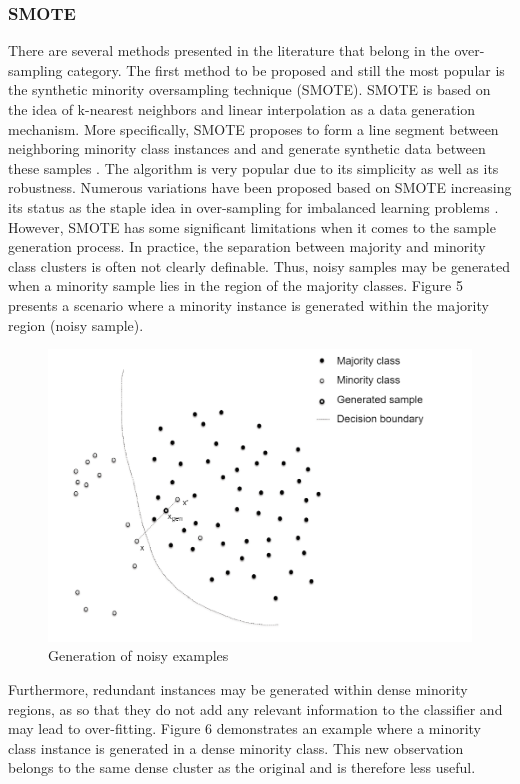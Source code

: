 \documentclass[parskip=full]{scrartcl}
\begin{document}
\subsubsection{SMOTE}

There are several methods presented in the literature that belong in the over-sampling category. The 
first method to be  proposed and still the most popular is the synthetic minority oversampling technique 
(SMOTE). SMOTE is based on the idea of k-nearest neighbors and linear interpolation as a data 
generation mechanism. More specifically, SMOTE proposes to form a line segment between neighboring 
minority class instances and and generate synthetic data between these samples \cite{Chawla.2002}. 
The algorithm is very popular due to its simplicity as well as its robustness. Numerous variations have 
been proposed based on SMOTE increasing its status as the staple idea in over-sampling for 
imbalanced learning problems \cite{Fernandez.2018}. However, SMOTE has some significant limitations 
when it comes to the sample generation process. In practice, the separation between majority and 
minority class clusters is often not clearly definable. Thus, noisy samples may be generated when a 
minority sample lies in the region of the majority classes. Figure 5 presents a scenario where a
minority instance is generated within the majority region (noisy sample).

\begin{figure}[H]
	\centering
	\includegraphics[width=0.6\linewidth]{./resources/noisy_examples}
	\caption{Generation of noisy examples \cite{Douzas.2019b}}
	\label{fig:noisy-examples}
\end{figure}

Furthermore, redundant instances may be generated within dense minority regions, as so that they do 
not add any relevant information to the classifier and may lead to over-fitting. Figure 6 demonstrates an 
example where a minority  class instance is generated in a dense minority class. This new observation 
belongs to the same dense cluster as the original and is therefore less useful. 
\end{document}

